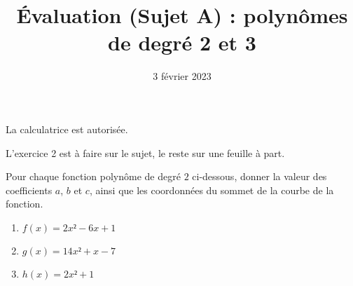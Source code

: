 \documentclass[
	classe=$1^{ere}STI2D$,
	headerTitle=Évaluation\space Chapitre\space 4
]{évaluation}
\date{3 février 2023}
\begin{document}
\title{Évaluation (Sujet A) : polynômes de degré 2 et 3}
\maketitle

\begin{tcolorbox}
	La calculatrice est autorisée.

	L'exercice 2 est à faire sur le sujet, le reste sur une feuille à part.
\end{tcolorbox}

\begin{exercice}
	Pour chaque fonction polynôme de degré $2$ ci-dessous, donner la valeur des coefficients $a$, $b$ et $c$, ainsi que les coordonnées du sommet de la courbe de la fonction.
	\begin{enumerate}
		\item $f(x) = 2x² - 6x + 1$
		\item $g(x) = 14x² + x - 7$
		\item $h(x) = 2x² + 1$
	\end{enumerate}
\end{exercice}
\end{document}
